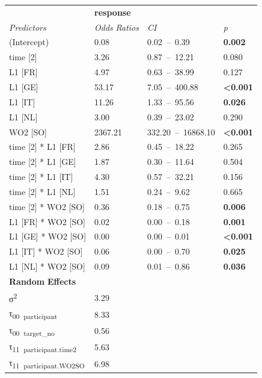\begin{table}
    \begin{tabularx}{\textwidth}{XXXX}
    \lsptoprule
    \textbf{~} & \multicolumn{3}{X}{ \textbf{response}}\\
    \textit{Predictors} & \textit{Odds} \textit{Ratios} & \textit{CI} & \textit{p}\\
    \midrule
    (Intercept) & 0.08 & 0.02~–~0.39 & \textbf{0.002}\\
    time [2] & 3.26 & 0.87~–~12.21 & 0.080\\
    L1 [FR] & 4.97 & 0.63~–~38.99 & 0.127\\
    L1 [GE] & 53.17 & 7.05~–~400.88 & \textbf{<0.001}\\
    L1 [IT] & 11.26 & 1.33~–~95.56 & \textbf{0.026}\\
    L1 [NL] & 3.00 & 0.39~–~23.02 & 0.290\\
    WO2 [SO] & 2367.21 & 332.20~–~16868.10 & \textbf{<0.001}\\
    time [2] * L1 [FR] & 2.86 & 0.45~–~18.22 & 0.265\\
    time [2] * L1 [GE] & 1.87 & 0.30~–~11.64 & 0.504\\
    time [2] * L1 [IT] & 4.30 & 0.57~–~32.21 & 0.156\\
    time [2] * L1 [NL] & 1.51 & 0.24~–~9.62 & 0.665\\
    time [2] * WO2 [SO] & 0.36 & 0.18~–~0.75 & \textbf{0.006}\\
    L1 [FR] * WO2 [SO] & 0.02 & 0.00~–~0.18 & \textbf{0.001}\\
    L1 [GE] * WO2 [SO] & 0.00 & 0.00~–~0.01 & \textbf{<0.001}\\
    L1 [IT] * WO2 [SO] & 0.06 & 0.00~–~0.70 & \textbf{0.025}\\
    L1 [NL] * WO2 [SO] & 0.09 & 0.01~–~0.86 & \textbf{0.036}\\
    \multicolumn{4}{X}{\textbf{Random} \textbf{Effects}}\\
    σ\textsuperscript{2} & \multicolumn{3}{X}{3.29}\\
    τ\textsubscript{00}~\textsubscript{participant} & \multicolumn{3}{X}{8.33}\\
    τ\textsubscript{00}~\textsubscript{target\_no} & \multicolumn{3}{X}{0.56}\\
    τ\textsubscript{11}~\textsubscript{participant.time2} & \multicolumn{3}{X}{5.63}\\
    τ\textsubscript{11}~\textsubscript{participant.WO2SO} & \multicolumn{3}{X}{6.98}\\

\end{tabularx}
\end{table}
